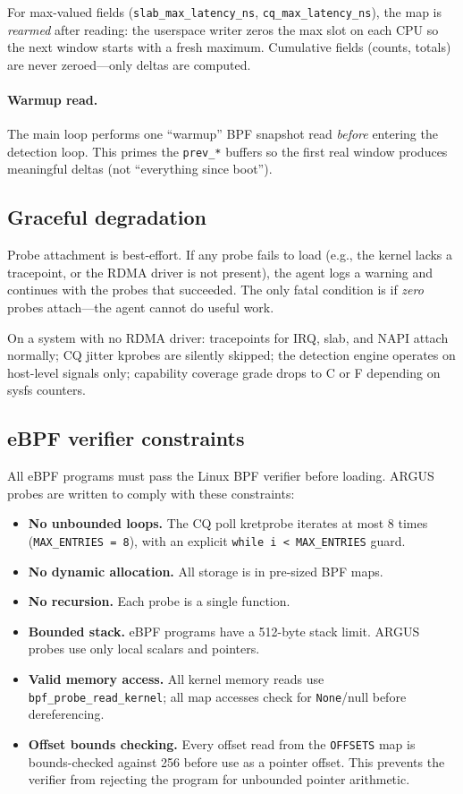 \documentclass[11pt]{article}
\begin{document}
For max-valued fields (\texttt{slab\_max\_latency\_ns},
\texttt{cq\_max\_latency\_ns}), the map is \emph{rearmed} after reading:
the userspace writer zeros the max slot on each CPU so the next window
starts with a fresh maximum. Cumulative fields (counts, totals) are never
zeroed---only deltas are computed.

\paragraph{Warmup read.}
The main loop performs one ``warmup'' BPF snapshot read \emph{before}
entering the detection loop. This primes the \texttt{prev\_*} buffers so
the first real window produces meaningful deltas (not ``everything since
boot'').

\subsection{Graceful degradation}

Probe attachment is best-effort. If any probe fails to load (e.g., the
kernel lacks a tracepoint, or the RDMA driver is not present), the agent
logs a warning and continues with the probes that succeeded. The only fatal
condition is if \emph{zero} probes attach---the agent cannot do useful work.

On a system with no RDMA driver: tracepoints for IRQ, slab, and NAPI
attach normally; CQ jitter kprobes are silently skipped; the detection
engine operates on host-level signals only; capability coverage grade
drops to C or F depending on sysfs counters.

\subsection{eBPF verifier constraints}

All eBPF programs must pass the Linux BPF verifier before loading. ARGUS
probes are written to comply with these constraints:

\begin{itemize}[nosep]
  \item \textbf{No unbounded loops.} The CQ poll kretprobe iterates at most
        8 times (\texttt{MAX\_ENTRIES = 8}), with an explicit
        \texttt{while i < MAX\_ENTRIES} guard.
  \item \textbf{No dynamic allocation.} All storage is in pre-sized BPF maps.
  \item \textbf{No recursion.} Each probe is a single function.
  \item \textbf{Bounded stack.} eBPF programs have a 512-byte stack limit.
        ARGUS probes use only local scalars and pointers.
  \item \textbf{Valid memory access.} All kernel memory reads use
        \texttt{bpf\_probe\_read\_kernel}; all map accesses check for
        \texttt{None}/null before dereferencing.
  \item \textbf{Offset bounds checking.} Every offset read from the
        \texttt{OFFSETS} map is bounds-checked against 256 before use as
        a pointer offset. This prevents the verifier from rejecting the
        program for unbounded pointer arithmetic.
\end{itemize}
\end{document}
